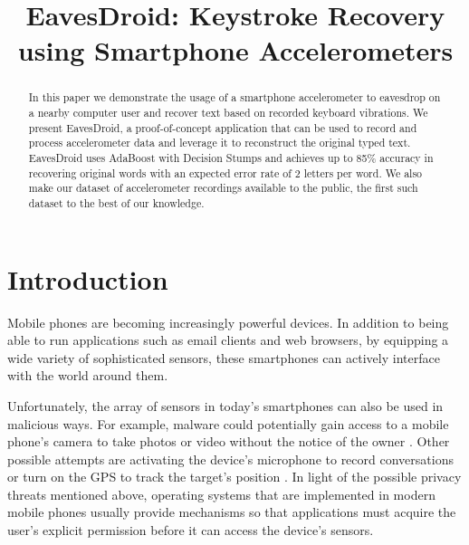 \documentclass[11pt,conference]{IEEEtran}
\begin{document}
\title{EavesDroid: Keystroke Recovery using Smartphone Accelerometers}

\author{
}

\maketitle

\begin{abstract}

In this paper we demonstrate the usage of a smartphone accelerometer to eavesdrop on a nearby computer user and recover text based on recorded keyboard vibrations.
 We present EavesDroid, a proof-of-concept application that can be used to record and process accelerometer data and leverage it to reconstruct the original typed text. EavesDroid
uses AdaBoost with Decision Stumps and achieves up to 85\% accuracy in recovering original words with an expected error rate of 2 letters per word.
We also make our dataset of accelerometer recordings available to the public, the first such dataset to the best of our knowledge. 

\end{abstract}
\IEEEpeerreviewmaketitle

\section{Introduction}
\label{sec:introduction}
\noindent Mobile phones are becoming increasingly powerful
devices. In addition to being able to run applications such as email clients and web browsers, by equipping a wide variety of sophisticated sensors, these smartphones can actively interface with the world around them.

\noindent Unfortunately, the array of sensors in today's smartphones can also be
used in malicious ways. For example, malware could
potentially gain access to a mobile phone's camera to take photos or
video without the notice of the owner \cite{cheng2007mobile}. Other possible attempts are activating the device's microphone to record conversations or turn on the GPS to track the target's position
\cite{dagon2004mobile, cai2009defending, enck2010taintdroid, egele2011pios}.
In light of the possible privacy threats mentioned above, operating systems that are implemented in modern mobile phones usually provide mechanisms so that applications must acquire the user's explicit permission before it can access the device's sensors.
\end{document}
